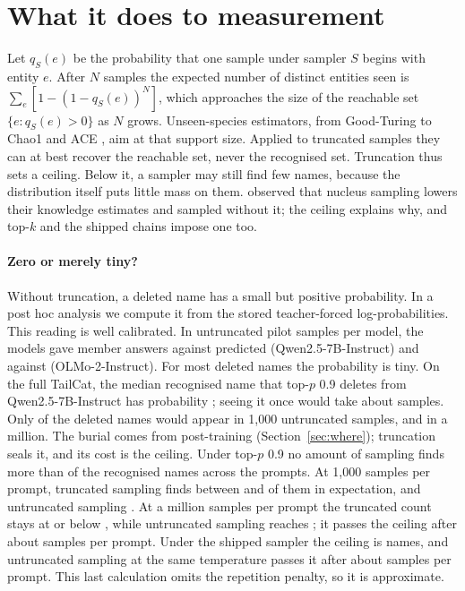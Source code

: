 \documentclass[11pt]{article}
\begin{document}
\section{What it does to measurement}\label{sec:measure}

Let $q_S(e)$ be the probability that one sample under sampler $S$ begins with entity $e$. After $N$ samples the expected number of distinct entities seen is $\sum_e[1-(1-q_S(e))^N]$, which approaches the size of the reachable set $\{e:q_S(e)>0\}$ as $N$ grows. Unseen-species estimators, from Good-Turing to Chao1 \citep{chao1984nonparametric} and ACE \citep{chao1992coverage}, aim at that support size. Applied to truncated samples they can at best recover the reachable set, never the recognised set. Truncation thus sets a ceiling. Below it, a sampler may still find few names, because the distribution itself puts little mass on them. \citet{li2025unseen} observed that nucleus sampling lowers their knowledge estimates and sampled without it; the ceiling explains why, and top-$k$ and the shipped chains impose one too.

\paragraph{Zero or merely tiny?} Without truncation, a deleted name has a small but positive probability. In a post hoc analysis we compute it from the stored teacher-forced log-probabilities. This reading is well calibrated. In \ztCalSamplesQI{} untruncated pilot samples per model, the models gave \ztCalObsQI{} member answers against \ztCalPredQI{} predicted (Qwen2.5-7B-Instruct) and \ztCalObsOI{} against \ztCalPredOI{} (OLMo-2-Instruct). For most deleted names the probability is tiny. On the full TailCat, the median recognised name that top-$p$ 0.9 deletes from Qwen2.5-7B-Instruct has probability \ztMedQQI{}; seeing it once would take about \ztMedSightQI{} samples. Only \ztSeenKQI{} of the deleted names would appear in 1{,}000 untruncated samples, and \ztSeenMQI{} in a million. The burial comes from post-training (Section~\ref{sec:where}); truncation seals it, and its cost is the ceiling. Under top-$p$ 0.9 no amount of sampling finds more than \ztPlateauQI{} of the \ztRecQI{} recognised names across the \ztPromptsQI{} prompts. At 1{,}000 samples per prompt, truncated sampling finds between \ztTruncKLoQI{} and \ztTruncKHiQI{} of them in expectation, and untruncated sampling \ztUntrKQI{}. At a million samples per prompt the truncated count stays at or below \ztTruncMHiQI{}, while untruncated sampling reaches \ztUntrMQI{}; it passes the ceiling after about \ztNstarQI{} samples per prompt. Under the shipped sampler the ceiling is \ztShipPlateauQI{} names, and untruncated sampling at the same temperature passes it after about \ztShipNstarQI{} samples per prompt. This last calculation omits the repetition penalty, so it is approximate.
\end{document}
